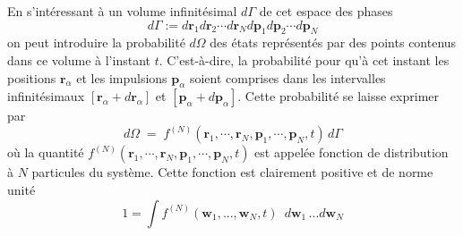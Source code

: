 En s'int\'{e}ressant \`{a} un volume infinit\'{e}simal $d\Gamma$ de cet espace
des phases
\[
d\Gamma:=d\mathbf{r}_{1}d\mathbf{r}_{2}\cdots d\mathbf{r}_{N}d\mathbf{p}%
_{1}d\mathbf{p}_{2}\cdots d\mathbf{p}_{N}
\]
on peut introduire la probabilit\'{e} $d\Omega$ des \'{e}tats
repr\'{e}sent\'{e}s par des points contenus dans ce volume \`{a} l'instant
$t$. C'est-\`{a}-dire, la probabilit\'{e} pour qu'\`{a} cet instant les
positions $\mathbf{r}_{\alpha}$ et les {impulsion}s $\mathbf{p}_{\alpha}$
soient comprises dans les intervalles infinit\'{e}simaux $[\mathbf{r}_{\alpha
}+d\mathbf{r}_{\alpha}]$ et $[\mathbf{p}_{\alpha}+d\mathbf{p}_{\alpha}]$.
Cette probabilit\'{e} se laisse exprimer par
\[
d\Omega\;=\;f^{(N)}(\mathbf{r}_{1},\cdots,\mathbf{r}_{N},\mathbf{p}_{1}%
,\cdots,\mathbf{p}_{N},t)\,d\Gamma
\]
o\`{u} la quantit\'{e} $f^{(N)}(\mathbf{r}_{1},\cdots,\mathbf{r}%
_{N},\mathbf{p}_{1},\cdots,\mathbf{p}_{N},t)$ est appel\'{e}e fonction de
distribution \`{a} $N$ particules du syst\`{e}me. Cette fonction est
clairement positive et de norme unit\'{e}
\[
1=\int f^{\left(  N\right)  }\left(  \mathbf{w}_{1},...,\mathbf{w}%
_{N},t\right)  \,\,\,d\mathbf{w}_{1}\,...d\mathbf{w}_{N}
\]
{\ }

